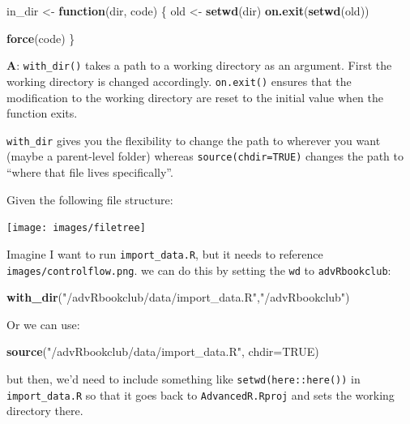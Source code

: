 \documentclass[]{book}
\newenvironment{Shaded}{\begin{snugshade}}{\end{snugshade}}
\newcommand{\ControlFlowTok}[1]{\textcolor[rgb]{0.13,0.29,0.53}{\textbf{#1}}}
\newcommand{\DataTypeTok}[1]{\textcolor[rgb]{0.13,0.29,0.53}{#1}}
\newcommand{\KeywordTok}[1]{\textcolor[rgb]{0.13,0.29,0.53}{\textbf{#1}}}
\newcommand{\NormalTok}[1]{#1}
\newcommand{\OtherTok}[1]{\textcolor[rgb]{0.56,0.35,0.01}{#1}}
\newcommand{\StringTok}[1]{\textcolor[rgb]{0.31,0.60,0.02}{#1}}
\begin{document}
\begin{Shaded}
\begin{Highlighting}[]
\NormalTok{    in_dir <-}\StringTok{ }\ControlFlowTok{function}\NormalTok{(dir, code) \{}
\NormalTok{      old <-}\StringTok{ }\KeywordTok{setwd}\NormalTok{(dir)}
      \KeywordTok{on.exit}\NormalTok{(}\KeywordTok{setwd}\NormalTok{(old))}
      
      \KeywordTok{force}\NormalTok{(code)}
\NormalTok{    \}}
\end{Highlighting}
\end{Shaded}

\textbf{{A}}: \texttt{with\_dir()} takes a path to a working directory as an argument. First the working directory is changed accordingly. \texttt{on.exit()} ensures that the modification to the working directory are reset to the initial value when the function exits.

\texttt{with\_dir} gives you the flexibility to change the path to wherever you want (maybe a parent-level folder) whereas \texttt{source(chdir=TRUE)} changes the path to ``where that file lives specifically''.

Given the following file structure:

\begin{center}\texttt{[image: images/filetree]} \end{center}

Imagine I want to run \texttt{import\_data.R}, but it needs to reference \texttt{images/controlflow.png}. we can do this by setting the \texttt{wd} to \texttt{advRbookclub}:

\begin{Shaded}
\begin{Highlighting}[]
\KeywordTok{with_dir}\NormalTok{(}\StringTok{"/advRbookclub/data/import_data.R"}\NormalTok{,}\StringTok{"/advRbookclub"}\NormalTok{)}
\end{Highlighting}
\end{Shaded}

Or we can use:

\begin{Shaded}
\begin{Highlighting}[]
\KeywordTok{source}\NormalTok{(}\StringTok{"/advRbookclub/data/import_data.R"}\NormalTok{, }\DataTypeTok{chdir=}\OtherTok{TRUE}\NormalTok{)}
\end{Highlighting}
\end{Shaded}

but then, we'd need to include something like \texttt{setwd(here::here())} in \texttt{import\_data.R} so that it goes back to \texttt{AdvancedR.Rproj} and sets the working directory there.
\end{document}
